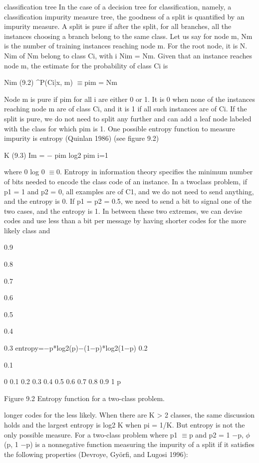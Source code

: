 classification tree In the case of a decision tree for classification, namely, a classification impurity measure tree, the goodness of a split is quantified by an impurity measure. A split is pure if after the split, for all branches, all the instances choosing a branch belong to the same class. Let us say for node m, Nm is the number of training instances reaching node m. For the root node, it is N. Nim of Nm belong to class Ci, with i Nim = Nm. Given that an instance reaches node m, the estimate for the probability of class Ci is

Nim (9.2) \textasciicircum{}P(Ci|x, m) $\equiv$pim = Nm

Node m is pure if pim for all i are either 0 or 1. It is 0 when none of the instances reaching node m are of class Ci, and it is 1 if all such instances are of Ci. If the split is pure, we do not need to split any further and can add a leaf node labeled with the class for which pim is 1. One possible entropy function to measure impurity is entropy (Quinlan 1986) (see figure 9.2)

K (9.3) Im = $-$ pim log2 pim i=1

where 0 log 0 $\equiv$0. Entropy in information theory specifies the minimum number of bits needed to encode the class code of an instance. In a twoclass problem, if p1 = 1 and p2 = 0, all examples are of C1, and we do not need to send anything, and the entropy is 0. If p1 = p2 = 0.5, we need to send a bit to signal one of the two cases, and the entropy is 1. In between these two extremes, we can devise codes and use less than a bit per message by having shorter codes for the more likely class and

0.9

0.8

0.7

0.6

0.5

0.4

0.3 entropy=$-$p*log2(p)$-$(1$-$p)*log2(1$-$p) 0.2

0.1

0 0.1 0.2 0.3 0.4 0.5 0.6 0.7 0.8 0.9 1 p

Figure 9.2 Entropy function for a two-class problem.

longer codes for the less likely. When there are K > 2 classes, the same discussion holds and the largest entropy is log2 K when pi = 1/K. But entropy is not the only possible measure. For a two-class problem where p1 $\equiv$p and p2 = 1 $-$p, $\phi$(p, 1 $-$p) is a nonnegative function measuring the impurity of a split if it satisfies the following properties (Devroye, Györfi, and Lugosi 1996):

